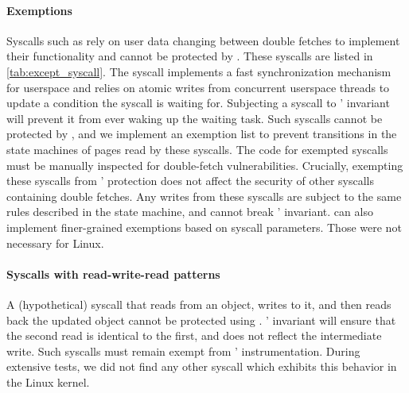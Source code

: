 \documentclass[letterpaper,twocolumn,10pt]{article}
\begin{document}
\paragraph{Exemptions}
Syscalls such as  rely on user data changing between double
fetches to implement their functionality and cannot be protected by
\midas.
These syscalls are listed in \autoref{tab:except_syscall}.
The  syscall implements a fast synchronization mechanism
for userspace and relies on atomic writes from concurrent userspace
threads to update a condition the syscall is waiting for.
Subjecting a  syscall to \midas' invariant will prevent
it from ever waking up the waiting task.
Such syscalls cannot be protected by \midas, and we implement an
exemption list to prevent transitions in the state machines of pages read
by these syscalls.
The code for exempted syscalls must be manually inspected for double-fetch
vulnerabilities.
Crucially, exempting these syscalls from \midas' protection does not
affect the security of other syscalls containing double fetches.
Any writes from these syscalls are subject to the same rules described
in the state machine, and cannot break \midas' invariant.
\midas can also implement finer-grained exemptions based on syscall
parameters. Those were not necessary for Linux.
%


\paragraph{Syscalls with read-write-read patterns}
A (hypothetical) syscall that reads from an object, writes to it, and
then reads back the updated object cannot be protected using \midas.
\midas' invariant will ensure that the second read is identical to the first,
and does not reflect the intermediate write.
Such syscalls must remain exempt from \midas' instrumentation.
During extensive tests, we did not find any other syscall which exhibits this behavior in the Linux
kernel.
\end{document}

